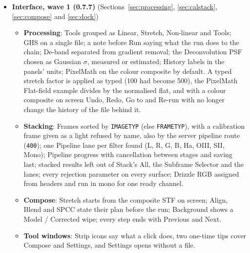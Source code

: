 \documentclass[11pt,a4paper]{article}
\newcommand{\code}[1]{\texttt{\small #1}}
\begin{document}
\begin{itemize}[nosep]
\begin{itemize}[nosep]
        \item \textbf{Mosaic by WCS}: Overlapping panels with a celestial WCS (header TAN-SIP, JWST and Roman gWCS, or an offline solution from header hints, never astrometry.net) are joined on one TAN canvas or on the canvas of another mosaic or FITS; NaN, DQ-flagged and blank-border pixels stay blank with coverage 0; levels are fitted per panel over the overlaps, seams are feathered and outliers rejected where three or more panels overlap. Estimate refuses a canvas above 40\,000\,px per side or the memory budget and more than 50 panels; the output is a float32 \code{SCI} image with an int32 \code{COVERAGE} plane, the canvas WCS, \code{PIXAR\_SR}, \code{PIXAR\_A2} and HISTORY, and star offsets above 0.5\,px in the overlaps are flagged.
        \end{itemize}
    \item \textbf{Interface, wave 1 (0.7.7)} (Sections~\ref{sec:processing}, \ref{sec:calstack}, \ref{sec:compose} and \ref{sec:dock})
        \begin{itemize}[nosep]
        \item \textbf{Processing}: Tools grouped as Linear, Stretch, Non-linear and Tools; GHS on a single file; a note before Run saying what the run does to the chain; De-band separated from gradient removal; the Deconvolution PSF chosen as Gaussian $\sigma$, measured or estimated; History labels in the panels' units; PixelMath on the colour composite by default. A typed stretch factor is applied as typed (100 had become 500), the PixelMath Flat-field example divides by the normalised flat, and with a colour composite on screen Undo, Redo, Go to and Re-run with no longer change the history of the file behind it.
        \item \textbf{Stacking}: Frames sorted by \code{IMAGETYP} (else \code{FRAMETYP}), with a calibration frame given as a light refused by name, also by the server pipeline route (\code{400}); one Pipeline lane per filter found (L, R, G, B, Ha, OIII, SII, Mono); Pipeline progress with cancellation between stages and saving last; stacked results left out of Stack's All, the Subframe Selector and the lanes; every rejection parameter on every surface; Drizzle RGB assigned from headers and run in mono for one ready channel.
        \item \textbf{Compose}: Stretch starts from the composite STF on screen; Align, Blend and SPCC state their plan before the run; Background shows a Model / Corrected wipe; every step ends with Previous and Next.
        \item \textbf{Tool windows}: Strip icons say what a click does, two one-time tips cover Compose and Settings, and Settings opens without a file.

\end{itemize}
\end{itemize}
\end{document}
